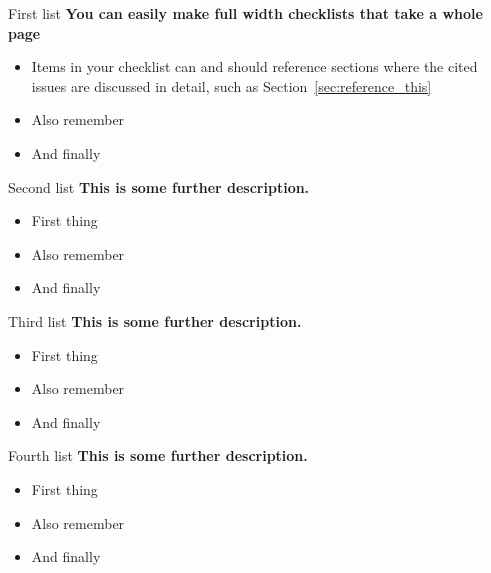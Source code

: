 \documentclass[9pt,bestpractices]{livecoms}
\begin{document}
\begin{Checklists*}[p!]

\begin{checklist}{First list}
\textbf{You can easily make full width checklists that take a whole page}
\begin{itemize}
\item Items in your checklist can and should reference sections where the cited issues are discussed in detail, such as Section~\ref{sec:reference_this}
\item Also remember
\item And finally
\end{itemize}
\end{checklist}

\begin{checklist}{Second list}
\textbf{This is some further description.}
\begin{itemize}
\item First thing
\item Also remember
\item And finally
\end{itemize}
\end{checklist}

\begin{checklist}{Third list}
\textbf{This is some further description.}
\begin{itemize}
\item First thing
\item Also remember
\item And finally
\end{itemize}
\end{checklist}

\begin{checklist}{Fourth list}
\textbf{This is some further description.}
\begin{itemize}
\item First thing
\item Also remember
\item And finally
\end{itemize}
\end{checklist}

\end{Checklists*}
\end{document}
